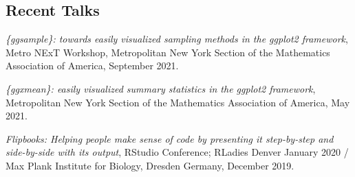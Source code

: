 \documentclass[margin, 10pt]{CVStyleTemplate}\usepackage[]{graphicx}\usepackage[]{color}
\begin{document}
\begin{resume}
%
%

%
%
%


\section{Recent Talks}

\emph{\{ggsample\}: towards easily visualized sampling methods in the ggplot2 framework},
Metro NExT Workshop, Metropolitan New York Section of the Mathematics Association of America, September 2021.

\emph{\{ggxmean\}: easily visualized summary statistics in the ggplot2 framework},
Metropolitan New York Section of the Mathematics Association of America, May 2021.

\emph{Flipbooks: Helping people make sense of code by presenting it step-by-step and side-by-side with its output},
RStudio Conference; RLadies Denver January 2020 /
Max Plank Institute for Biology, Dresden Germany, December 2019.


\end{resume}
\end{document}
